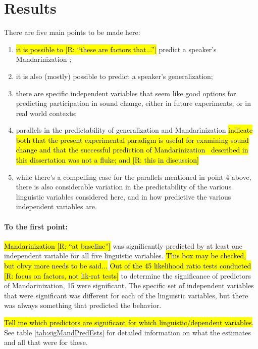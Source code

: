 \section{Results}
There are five main points to be made here:
\begin{enumerate}
    \item \hl{it is possible to [R: ``these are factors that...'']} predict a speaker's Mandarinization \IRL;
    \item it is also (mostly) possible to predict a speaker's generalization;
    \item there are specific independent variables that seem like good options for predicting participation in sound change, either in future experiments, or in real world contexts;
    \item parallels in the predictability of generalization and Mandarinization \hl{indicate both that the present experimental paradigm is useful for examining sound change and that the successful prediction of Mandarinization \IRL~described in this dissertation was not a fluke; and [R: this in discussion]}
    \item while there's a compelling case for the parallels mentioned in point 4 above, there is also considerable variation in the predictability of the various linguistic variables considered here, and in how predictive the various independent variables are.
\end{enumerate}

\paragraph{To the first point:}

\hl{Mandarinization [R: ``at baseline'']} was significantly predicted by at least one independent variable for all five linguistic variables. \hl{This box may be checked, but obvy more needs to be said...} \hl{Out of the 45 likelihood ratio tests conducted [R: focus on factors, not lik-rat tests]} to determine the significance of predictors of Mandarinization, 15 were significant. The specific set of independent variables that were significant was different for each of the linguistic variables, but there was always something that predicted the behavior.

\hl{Tell me which predictors are significant for which linguistic/dependent variables}. See table \ref{tab:sigMandPredEsts} for detailed information on what the estimates and all that were for these.

